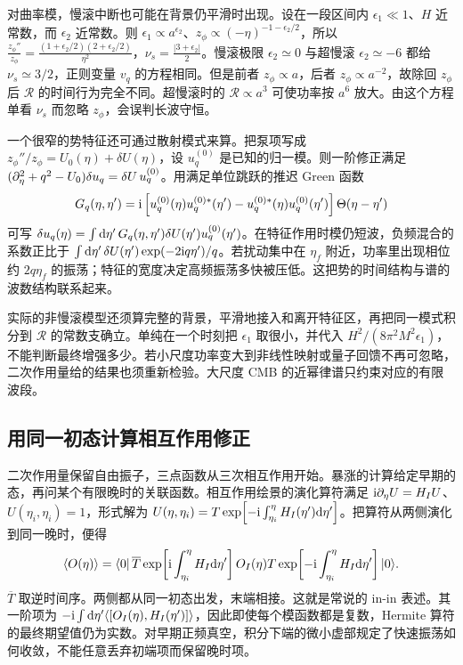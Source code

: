 对曲率模，慢滚中断也可能在背景仍平滑时出现。设在一段区间内 $\epsilon_1\ll1$、$H$ 近常数，而 $\epsilon_2$ 近常数。则 $\epsilon_1\propto a^{\epsilon_2}$、$z_\phi\propto(-\eta)^{-1-\epsilon_2/2}$，所以 $\frac{z_\phi''}{z_\phi} =\frac{(1+\epsilon_2/2)(2+\epsilon_2/2)}{\eta^2}$，$\nu_s=\frac{|3+\epsilon_2|}{2}$。慢滚极限 $\epsilon_2\simeq0$ 与超慢滚 $\epsilon_2\simeq-6$ 都给 $\nu_s\simeq3/2$，正则变量 $v_q$ 的方程相同。但是前者 $z_\phi\propto a$，后者 $z_\phi\propto a^{-2}$，故除回 $z_\phi$ 后 $\mathcal R$ 的时间行为完全不同。超慢滚时的 $\mathcal R\propto a^3$ 可使功率按 $a^6$ 放大。由这个方程单看 $\nu_s$ 而忽略 $z_\phi$，会误判长波守恒。

一个很窄的势特征还可通过散射模式来算。把泵项写成 $z_\phi''/z_\phi=U_0(\eta)+\delta U(\eta)$，设 $u_q^{(0)}$ 是已知的归一模。则一阶修正满足 $(\partial_\eta^2+q^2-U_0)\delta u_q=\delta U\,u_q^{(0)}$。用满足单位跳跃的推迟 Green 函数
\[
 G_q(\eta,\eta')=
 \mathrm{i}\left[u_q^{(0)}(\eta)u_q^{(0)*}(\eta')
        -u_q^{(0)*}(\eta)u_q^{(0)}(\eta')\right]\Theta(\eta-\eta')
\]
可写 $\delta u_q(\eta)=\int\dd\eta'\,G_q(\eta,\eta')\delta U(\eta')u_q^{(0)}(\eta')$。在特征作用时模仍短波，负频混合的系数正比于 $\int\dd\eta'\,\delta U(\eta')\exp(-2\mathrm{i} q\eta')/q$。若扰动集中在 $\eta_f$ 附近，功率里出现相位约 $2q\eta_f$ 的振荡；特征的宽度决定高频振荡多快被压低。这把势的时间结构与谱的波数结构联系起来。

实际的非慢滚模型还须算完整的背景，平滑地接入和离开特征区，再把同一模式积分到 $\mathcal R$ 的常数支确立。单纯在一个时刻把 $\epsilon_1$ 取很小，并代入 $H^2/(8\pi^2M^2\epsilon_1)$，不能判断最终增强多少。若小尺度功率变大到非线性映射或量子回馈不再可忽略，二次作用量给的结果也须重新检验。大尺度 CMB 的近幂律谱只约束对应的有限波段。

\subsection{用同一初态计算相互作用修正}\label{sec:cosmo-inf-inin}

二次作用量保留自由振子，三点函数从三次相互作用开始。暴涨的计算给定早期的态，再问某个有限晚时的关联函数。相互作用绘景的演化算符满足 $\mathrm{i}\partial_\eta U=H_IU$、$U(\eta_i,\eta_i)=1$，形式解为 $U(\eta,\eta_i)=T\exp\!\left[-\mathrm{i}\int_{\eta_i}^{\eta}H_I(\eta')\dd\eta'\right]$。把算符从两侧演化到同一晚时，便得
\begin{equation}\label{eq:cosmo-inf-inin}
 \langle O(\eta)\rangle
 =\langle0|\,\overline T\exp\!\left[\mathrm{i}\int_{\eta_i}^{\eta}H_I\dd\eta'\right]
 O_I(\eta)
 T\exp\!\left[-\mathrm{i}\int_{\eta_i}^{\eta}H_I\dd\eta'\right]|0\rangle .
\end{equation}
$\overline T$ 取逆时间序。两侧都从同一初态出发，末端相接。这就是常说的 in-in 表述。其一阶项为 $-\mathrm{i}\int\dd\eta'\langle[O_I(\eta),H_I(\eta')]\rangle$，因此即使每个模函数都是复数，Hermite 算符的最终期望值仍为实数。对早期正频真空，积分下端的微小虚部规定了快速振荡如何收敛，不能任意丢弃初端项而保留晚时项。

